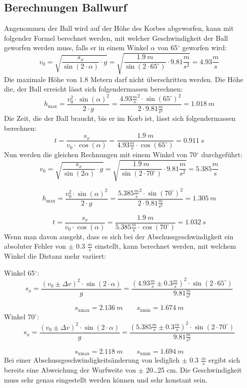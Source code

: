 \subsection{Berechnungen Ballwurf}
Angenommen der Ball wird auf der Höhe des Korbes abgeworfen, kann mit 
folgender Formel berechnet werden, mit welcher Geschwindigkeit der Ball 
geworfen werden muss, falls er in einem Winkel $\alpha$ von 65$^\circ$ 
geworfen wird:
%
\[ v_0 
    = \sqrt{ \frac{s_x}{\sin(2 \cdot \alpha)} \cdot g } 
    = \sqrt{ \frac{1.9~m}{\sin(2 \cdot 65^\circ)} \cdot 9.81 \frac{m}{s^2}} 
    = 4.93 \frac{m}{s} \]
%
Die maximale Höhe von 1.8 Metern darf nicht überschritten werden. Die Höhe 
die, der Ball erreicht lässt sich folgendermassen berechnen:
%
\[ h_\text{max} 
    = \frac{v_0^2 \cdot \sin(\alpha)^2}{2 \cdot g} 
    = \frac{4.93 \frac{m}{s}^2 \cdot \sin(65^\circ)^2}{2 \cdot 9.81 \frac{m}{s^2}} 
    = 1.018~m \]
%
Die Zeit, die der Ball braucht, bis er im Korb ist, lässt sich folgendermassen 
berechnen:
%
\[ t = \frac{s_x}{v_0 \cdot \cos(\alpha)} 
    = \frac{1.9~m}{4.93 \frac{m}{s} \cdot \cos(65^\circ)} = 0.911~s \]
%
Nun werden die gleichen Rechnungen mit einem Winkel von 70$^\circ$ durchgeführt:
%
\[ v_0 = \sqrt{ \frac{s_x}{\sin(2\alpha)} \cdot g } 
    = \sqrt{ \frac{1.9~m}{\sin(2 \cdot 70^\circ)} \cdot 9.81 \frac{m}{s^2}} 
    = 5.385 \frac{m}{s} \]

\[ h_\text{max} = \frac{v_0^2 \cdot \sin(\alpha)^2}{2 \cdot g} 
    = \frac{5.385 \frac{m}{s}^2 \cdot \sin(70^\circ)^2}{2 \cdot 9.81 \frac{m}{s^2}} 
    = 1.305~m \]

\[ t = \frac{s_x}{v_0 \cdot \cos(\alpha)} 
    = \frac{1.9~m}{5.385 \frac{m}{s} \cdot \cos(70^\circ)} = 1.032~s \]
%
Wenn man davon ausgeht, dass es sich bei der Abschussgeschwindigkeit ein 
absoluter Fehler von $\pm$ 0.3 $\frac{m}{s}$ einstellt, kann berechnet werden, mit 
welchem Winkel die Distanz mehr variiert:

\noindent
Winkel 65$^\circ$:
%
\[ s_x = \frac{(v_0 \pm \Delta v)^2 \cdot \sin(2 \cdot \alpha)}{g} 
    = \frac{(4.93 \frac{m}{s} \pm 0.3 \frac{m}{s})^2 \cdot \sin(2 \cdot 65^\circ)}{9.81 \frac{m}{s^2}} \]

\[ s_\text{xmax} = 2.136~m \qquad s_\text{xmin} = 1.674~m \]
%
Winkel 70$^\circ$:
%
\[ s_x = \frac{(v_0 \pm \Delta v)^2 \cdot \sin(2 \cdot \alpha)}{g} 
    = \frac{(5.385 \frac{m}{s} \pm 0.3 \frac{m}{s})^2 \cdot \sin(2 \cdot 70^\circ)}{9.81 \frac{m}{s^2}} \]

\[ s_\text{xmax} = 2.118~m \qquad s_\text{xmin} = 1.694~m \]
%
Bei einer Abschussgeschwindigkeitsänderung von lediglich $\pm$ 0.3 $\frac{m}{s}$ ergibt 
sich bereits eine Abweichung der Wurfweite von $\pm$ 20\ldots25 cm. Die 
Geschwindigkeit muss sehr genau eingestellt werden können und sehr konstant sein.


